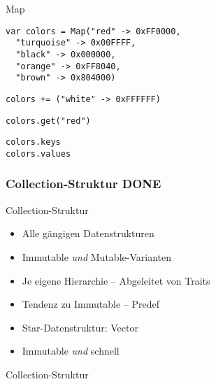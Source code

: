 \documentclass[14pt,aspectratio=169,trans]{beamer} %
\begin{document}
\begin{frame}[fragile]{}
 \begin{block}{Map}
\scriptsize
	\onslide<2->
  \begin{lstlisting}
var colors = Map("red" -> 0xFF0000,
  "turquoise" -> 0x00FFFF,
  "black" -> 0x000000,
  "orange" -> 0xFF8040,
  "brown" -> 0x804000)
	\end{lstlisting}
  \begin{lstlisting}[firstnumber = 6]
colors += ("white" -> 0xFFFFFF)
\end{lstlisting}
  \begin{lstlisting}[firstnumber = 7]
colors.get("red")
\end{lstlisting}
  \begin{lstlisting}[firstnumber = 8]
colors.keys
colors.values
\end{lstlisting}
\end{block}
\note{
}
\end{frame}

\subsubsection*{Collection-Struktur DONE} 

\begin{frame}{}
	\begin{block}{Collection-Struktur}
		\begin{itemize}
			\item<2->Alle gängigen Datenstrukturen
			\item<3->Immutable \emph{und} Mutable-Varianten
			\item<4->Je eigene Hierarchie -- Abgeleitet von Traits
			\item<5->Tendenz zu Immutable -- Predef
			\item<6->Star-Datenstruktur: Vector
			\item<7->Immutable \emph{und} schnell
		\end{itemize}
	\end{block}
	\note{}
\end{frame}

\begin{frame}[plain]
\begin{block}{Collection-Struktur}
   \begin{centering} 
     \par
   \end{centering}
	\end{block}
\end{frame} 
\end{document}
